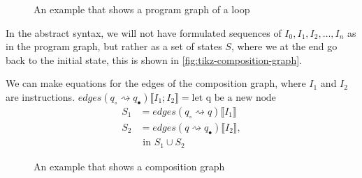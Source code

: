 \begin{figure}[htb!]
    \center
    
    \caption{An example that shows a program graph of a loop}
    \label{fig:tikz-program-graph-loop}
\end{figure}

In the abstract syntax, we will not have formulated sequences of $I_0, I_1, I_2, \dots, I_n$ as in the program graph, but rather as a set of states $S$, where we at the end go back to the initial state, this is shown in \autoref{fig:tikz-composition-graph}.

We can make equations for the edges of the composition graph, where $I_1$ and $I_2$ are instructions.
$edges(q_{\circ} \rightsquigarrow q_{\bullet})\llbracket I_1 ; I_2 \rrbracket = \text{let q be a new node}$
\begin{align}
S_1 &= edges(q_{\circ} \rightsquigarrow q)\llbracket I_1 \rrbracket\\
S_2 &= edges(q \rightsquigarrow q_{\bullet})\llbracket I_2 \rrbracket, \\
&\text{ in } S_1 \cup S_2
\end{align}

\begin{figure}
    \center
    
    \caption{An example that shows a composition graph}
    \label{fig:tikz-composition-graph}
\end{figure}